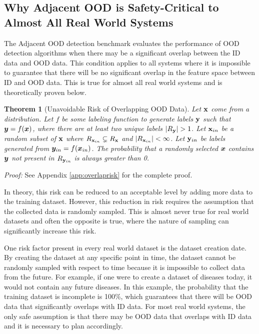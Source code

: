 \documentclass[11pt, oneside]{book}
\theoremstyle{plain}
\newtheorem{theorem}{Theorem}[section]
\theoremstyle{definition}
\theoremstyle{remark}
\begin{document}
\subsection{Why Adjacent OOD is Safety-Critical to Almost All Real World Systems}

The Adjacent OOD detection benchmark evaluates the performance of OOD detection algorithms when there may be a significant overlap between the ID data and OOD data. This condition applies to all systems where it is impossible to guarantee that there will be no significant overlap in the feature space between ID and OOD data. This is true for almost all real world systems and is theoretically proven below.

\begin{theorem}[Unavoidable Risk of Overlapping OOD Data]
Let ${\mathbf{x}}$ come from a distribution. Let $f$ be some labeling function to generate labels ${\mathbf{y}}$ such that ${\bm{y}} = f({\bm{x}})$, where there are at least two unique labels $|R_{\mathbf{y}}| > 1$. Let ${\mathbf{x}}_{in}$ be a random subset of ${\mathbf{x}}$ where $R_{{\mathbf{x}}_{in}} \subsetneq R_{\mathbf{x}}$ and $|R_{{\mathbf{x}}_{in}}| < \infty$. Let ${\mathbf{y}}_{in}$ be labels generated from ${\bm{y}}_{in} = f({\bm{x}}_{in})$. The probability that a randomly selected ${\bm{x}}$ contains ${\bm{y}}$ not present in $R_{{\mathbf{y}}_{in}}$ is always greater than 0.
\label{mainbodyoverlap}
\end{theorem}

\textit{Proof:} See Appendix \ref{app:overlaprisk} for the complete proof.

In theory, this risk can be reduced to an acceptable level by adding more data to the training dataset. However, this reduction in risk requires the assumption that the collected data is randomly sampled. This is almost never true for real world datasets and often the opposite is true, where the nature of sampling can significantly increase this risk.

One risk factor present in every real world dataset is the dataset creation date. By creating the dataset at any specific point in time, the dataset cannot be randomly sampled with respect to time because it is impossible to collect data from the future. For example, if one were to create a dataset of diseases today, it would not contain any future diseases. In this example, the probability that the training dataset is incomplete is 100\%, which guarantees that there will be OOD data that significantly overlaps with ID data. For most real world systems, the only safe assumption is that there may be OOD data that overlaps with ID data and it is necessary to plan accordingly.
\end{document}
